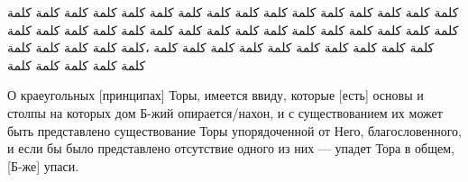 \documentclass{book}
\begin{document}
\begin{pairs}

\begin{Rightside} 
\begin{RTL}
\begin{Arabic}
\beginnumbering
\pstart
{}
\pend
\pstart
كلمة كلمة كلمة كلمة كلمة كلمة كلمة كلمة 
كلمة كلمة كلمة كلمة كلمة كلمة كلمة كلمة كلمة كلمة كلمة كلمة كلمة كلمة 
كلمة كلمة كلمة كلمة كلمة كلمة كلمة كلمة كلمة كلمة كلمة كلمة كلمة كلمة كلمة كلمة كلمة كلمة كلمة كلمة ،كلمة كلمة كلمة كلمة كلمة  كلمة كلمة كلمة كلمة كلمة  
\pend    
\endnumbering
\end{Arabic}
\end{RTL}
\end{Rightside}

\begin{Leftside} 
\begin{russian}
\beginnumbering
\pstart
{}   
\pend 
\pstart
О краеугольных [принципах] Торы, имеется ввиду, которые [есть] основы и столпы на которых дом Б-жий опирается/нахон, и с существованием их может быть представлено существование Торы упорядоченной от Него, благословенного, и если бы было представлено отсутствие одного из них — упадет Тора в общем, [Б-же] упаси.
\pend
\endnumbering
\end{russian}
\end{Leftside}

\end{pairs}
\Columns
\end{document}
